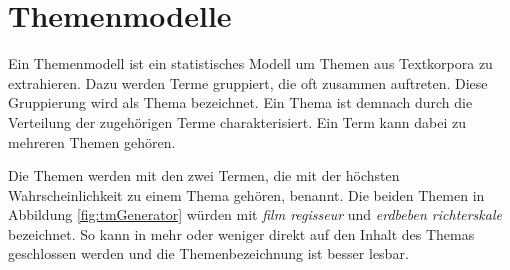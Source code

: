 \section{Themenmodelle}
\label{sec:topicModels}

Ein Themenmodell \citep{Hofmann1999,Blei2003LDA,Steyvers2006} ist ein statistisches Modell um Themen aus Textkorpora zu extrahieren. Dazu werden Terme gruppiert, die oft zusammen auftreten. Diese Gruppierung wird als Thema bezeichnet. Ein Thema ist demnach durch die Verteilung der zugehörigen Terme charakterisiert. Ein Term kann dabei zu mehreren Themen gehören. 

Die  Themen werden mit den zwei Termen, die mit der höchsten Wahrscheinlichkeit zu einem Thema gehören, benannt. Die beiden Themen in Abbildung \ref{fig:tmGenerator} würden mit \textit{film regisseur} und \textit{erdbeben richterskale} bezeichnet. So kann in mehr oder weniger direkt auf den Inhalt des Themas geschlossen werden und die Themenbezeichnung ist besser lesbar.  

